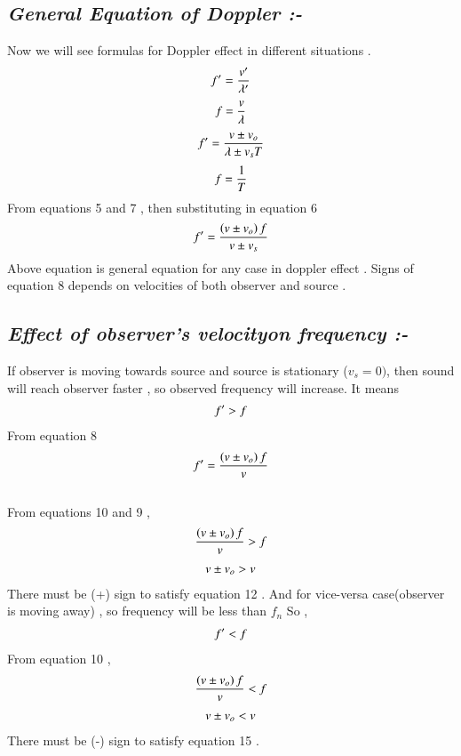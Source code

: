 \documentclass[journal,12pt,twocolumn]{IEEEtran}
\theoremstyle{remark}
\begin{document}
\subsection*{\textit{General \;Equation \;of \;Doppler :-}}
Now we will see formulas for Doppler effect in different situations . \\
\begin{align}{\label{eq2}}f' = \frac{v'}{\lambda'}\end{align}
\begin{align}{\label{eq3}}f = \frac{v}{\lambda}\end{align}
\begin{align}{\label{eq4}}f' = \frac{v \pm v_o}{\lambda \pm v_s T}\end{align}
\begin{align}{\label{eq5}}f = \frac{1}{T}\end{align}
From equations 5 and 7 , then substituting in equation 6
\begin{align}{\label{eq6}}f' = \frac{\left(v \pm v_o\right)f}{v \pm v_s }\end{align}
Above equation is general equation for any case in doppler effect .
Signs of equation 8 depends on velocities of both observer and source .
\subsection*{\textit{Effect \;of  \;observer's  \;velocity\;on \;frequency :-}}
If observer is moving towards source and source is stationary ($v_s=0)$, then sound will reach observer faster , so observed frequency will increase. It means \begin{align}{\label{eq7}}f'>f\end{align} From equation 8 \begin{align}{\label{eq8}} f' = \frac{\left(v \pm v_o\right)f}{v}\end{align}\\
From equations 10 and 9 , 
\begin{align} \frac{\left(v \pm v_o\right)f}{v} > f\end{align}
\begin{align}{\label{eq10}} v \pm v_o > v\end{align}
 There must be (+) sign to satisfy equation 12 .
And for vice-versa case(observer is moving away) , so frequency will be less than $f_n$
So ,\begin{align}{\label{eq11}}f'<f\end{align}
From equation 10 ,
\begin{align}\frac{\left(v \pm v_o\right)f}{v} < f\end{align}
\begin{align}{\label{eq13}} v \pm v_o < v\end{align}
There must be (-) sign to satisfy equation 15 .
\end{document}

